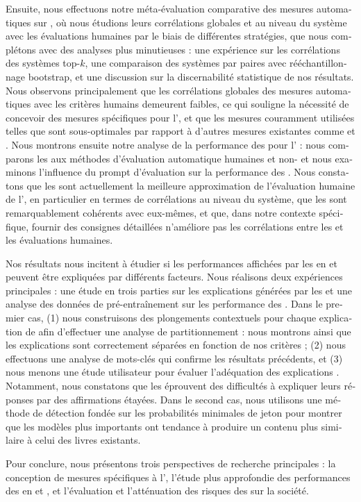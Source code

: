 \begin{otherlanguage}{french}
Ensuite, nous effectuons notre méta-évaluation comparative des mesures automatiques sur {\hanna}, où nous étudions leurs corrélations globales et au niveau du système avec les évaluations humaines par le biais de différentes stratégies, que nous complétons avec des analyses plus minutieuses : une expérience sur les corrélations des systèmes top-$k$, une comparaison des systèmes par paires avec rééchantillonnage bootstrap, et une discussion sur la discernabilité statistique de nos résultats. Nous observons principalement que les corrélations globales des mesures automatiques avec les critères humains demeurent faibles, ce qui souligne la nécessité de concevoir des mesures spécifiques pour l'{\ase}, et que les mesures couramment utilisées telles que {\bleu} sont sous-optimales par rapport à d'autres mesures existantes comme {\bertscore} et {\bartscore}. Nous montrons ensuite notre analyse de la performance des {\llm} pour l'{\ase} : nous comparons les {\llm} aux méthodes d'évaluation automatique humaines et non-{\llm} et nous examinons l'influence du prompt d'évaluation sur la performance des {\llm}. Nous constatons que les {\llm} sont actuellement la meilleure approximation de l'évaluation humaine de l'{\asg}, en particulier en termes de corrélations au niveau du système, que les {\llm} sont remarquablement cohérents avec eux-mêmes, et que, dans notre contexte spécifique, fournir des consignes détaillées n'améliore pas les corrélations entre les {\llm} et les évaluations humaines.

Nos résultats nous incitent à étudier si les performances affichées par les {\llm} en {\ase} et {\asg} peuvent être expliquées par différents facteurs. Nous réalisons deux expériences principales : une étude en trois parties sur les explications générées par les {\llm} et une analyse des données de pré-entraînement sur les performance des {\llm}. Dans le premier cas, (1) nous construisons des plongements contextuels pour chaque explication de {\llm} afin d'effectuer une analyse de partitionnement : nous montrons ainsi que les explications sont correctement séparées en fonction de nos critères ; (2) nous effectuons une analyse de mots-clés qui confirme les résultats précédents, et (3) nous menons une étude utilisateur pour évaluer l'adéquation des explications {\llm}. Notamment, nous constatons que les {\llm} éprouvent des difficultés à expliquer leurs réponses par des affirmations étayées. Dans le second cas, nous utilisons une méthode de détection fondée sur les probabilités minimales de jeton pour montrer que les modèles plus importants ont tendance à produire un contenu plus similaire à celui des livres existants.

Pour conclure, nous présentons trois perspectives de recherche principales : la conception de mesures spécifiques à l'{\ase}, l'étude plus approfondie des performances des {\llm} en {\asg} et {\ase}, et l'évaluation et l'atténuation des risques des {\llm} sur la société.

\end{otherlanguage}